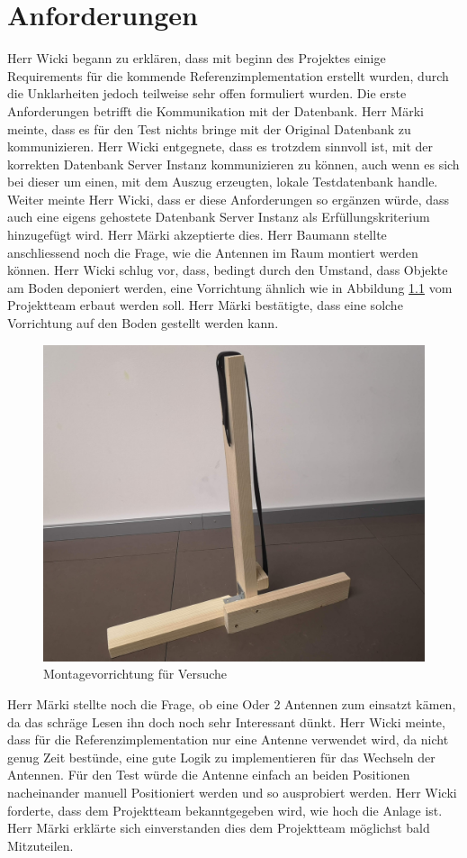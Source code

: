\documentclass[parskip=full, a4paper]{scrreprt}
\begin{document}
\chapter{Anforderungen}
Herr Wicki begann zu erklären, dass mit beginn des Projektes einige Requirements für die kommende Referenzimplementation erstellt wurden, durch die Unklarheiten jedoch teilweise sehr offen formuliert wurden. Die erste Anforderungen betrifft die Kommunikation mit der Datenbank. Herr Märki meinte, dass es für den Test nichts bringe mit der Original Datenbank zu kommunizieren. Herr Wicki entgegnete, dass es trotzdem sinnvoll ist, mit der korrekten Datenbank Server Instanz kommunizieren zu können, auch wenn es sich bei dieser um einen, mit dem Auszug erzeugten, lokale Testdatenbank handle. Weiter meinte Herr Wicki, dass er diese Anforderungen so ergänzen würde, dass auch eine eigens gehostete Datenbank Server Instanz als Erfüllungskriterium hinzugefügt wird. Herr Märki akzeptierte dies.
Herr Baumann stellte anschliessend noch die Frage, wie die Antennen im Raum montiert werden können. Herr Wicki schlug vor, dass, bedingt durch den Umstand, dass Objekte am Boden deponiert werden, eine Vorrichtung ähnlich wie in Abbildung \ref{fig:montagevorrichtung} vom Projektteam erbaut werden soll. Herr Märki bestätigte, dass eine solche Vorrichtung auf den Boden gestellt werden kann.
\begin{figure}[htb]
	\centering
	\includegraphics[keepaspectratio,width=.7\linewidth]{img/Montagevorrichtung}
	\caption{Montagevorrichtung für Versuche}
	\label{fig:montagevorrichtung}
\end{figure}
Herr Märki stellte noch die Frage, ob eine Oder 2 Antennen zum einsatzt kämen, da das schräge Lesen ihn doch noch sehr Interessant dünkt. Herr Wicki meinte, dass für die Referenzimplementation nur eine Antenne verwendet wird, da nicht genug Zeit bestünde, eine gute Logik zu implementieren für das Wechseln der Antennen. Für den Test würde die Antenne einfach an beiden Positionen nacheinander manuell Positioniert werden und so ausprobiert werden.
Herr Wicki forderte, dass dem Projektteam bekanntgegeben wird, wie hoch die Anlage ist. Herr Märki erklärte sich einverstanden dies dem Projektteam möglichst bald Mitzuteilen.
\end{document}
